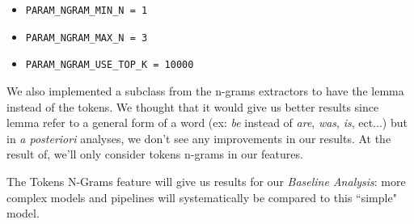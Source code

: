 \begin{itemize}[label={}]
  \item \texttt{PARAM\_NGRAM\_MIN\_N = 1}
  \item \texttt{PARAM\_NGRAM\_MAX\_N = 3}
  \item \texttt{PARAM\_NGRAM\_USE\_TOP\_K = 10000}
\end{itemize}

We also implemented a subclass from the n-grams extractors to have the lemma instead of the tokens. We thought that it would give us better results since lemma refer to a general form of a word (ex: \emph{be} instead of \emph{are}, \emph{was}, \emph{is}, ect...) but in \emph{a posteriori} analyses, we don't see any improvements in our results. At the result of, we'll only consider tokens n-grams in our features.

The Tokens N-Grams feature will give us results for our \emph{Baseline Analysis}: more complex models and pipelines will systematically be compared to this ``simple" model.


